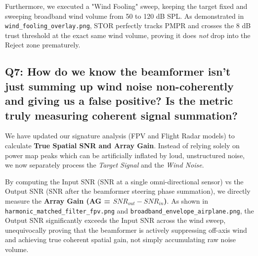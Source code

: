 \documentclass[12pt,letterpaper]{article}
\begin{document}
Furthermore, we executed a "Wind Fooling" sweep, keeping the target fixed and sweeping broadband wind volume from 50 to 120 dB SPL. As demonstrated in \texttt{wind\_fooling\_overlay.png}, STOR perfectly tracks PMPR and crosses the 8 dB trust threshold at the exact same wind volume, proving it does \textit{not} drop into the Reject zone prematurely.


\subsection*{Q7: How do we know the beamformer isn't just summing up wind noise non-coherently and giving us a false positive? Is the metric truly measuring coherent signal summation?}
We have updated our signature analysis (FPV and Flight Radar models) to calculate \textbf{True Spatial SNR and Array Gain}. Instead of relying solely on power map peaks which can be artificially inflated by loud, unstructured noise, we now separately process the \textit{Target Signal} and the \textit{Wind Noise}.

By computing the Input SNR (SNR at a single omni-directional sensor) vs the Output SNR (SNR after the beamformer steering phase summation), we directly measure the \textbf{Array Gain (AG = $SNR_{out} - SNR_{in}$)}.
As shown in \texttt{harmonic\_matched\_filter\_fpv.png} and \texttt{broadband\_envelope\_airplane.png}, the Output SNR significantly exceeds the Input SNR across the wind sweep, unequivocally proving that the beamformer is actively suppressing off-axis wind and achieving true coherent spatial gain, not simply accumulating raw noise volume.
\end{document}
